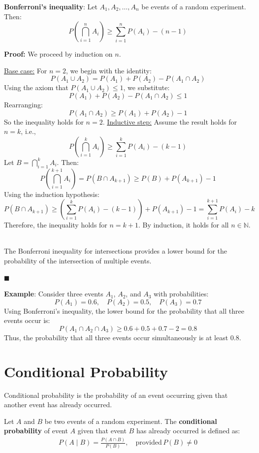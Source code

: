 \documentclass[twoside]{book}
\begin{document}
\begin{textbox}
\textbf{Bonferroni's inequality}: Let \( A_1, A_2, \ldots, A_n \) be events of a random experiment. Then:
\[
P\left( \bigcap_{i=1}^n A_i \right) \geq \sum_{i=1}^n P(A_i) - (n - 1)
\]
\end{textbox}
\textbf{Proof:} We proceed by induction on \( n \).

\underline{Base case:} For \( n = 2 \),
we begin with the identity:
\[
P(A_1 \cup A_2) = P(A_1) + P(A_2) - P(A_1 \cap A_2)
\]
Using the axiom that \( P(A_1 \cup A_2) \leq 1 \), we substitute:
\[
P(A_1) + P(A_2) - P(A_1 \cap A_2) \leq 1
\]
Rearranging:
\[
 P(A_1 \cap A_2) \geq P(A_1) + P(A_2) - 1
\]
So the inequality holds for $n = 2$.
\underline{Inductive step:} Assume the result holds for \( n = k \), i.e.,
\[
P\left( \bigcap_{i=1}^{k} A_i \right) \geq \sum_{i=1}^{k} P(A_i) - (k - 1)
\]
Let \( B = \bigcap_{i=1}^{k} A_i \). Then:
\[
P\left( \bigcap_{i=1}^{k+1} A_i \right) = P(B \cap A_{k+1}) \geq P(B) + P(A_{k+1}) - 1
\]
Using the induction hypothesis:
\[
P(B \cap A_{k+1}) \geq \left( \sum_{i=1}^{k} P(A_i) - (k - 1) \right) + P(A_{k+1}) - 1 = \sum_{i=1}^{k+1} P(A_i) - k
\]
Therefore, the inequality holds for \( n = k + 1 \). By induction, it holds for all \( n \in \mathbb{N} \). \

The Bonferroni inequality for intersections provides a lower bound for the probability of the intersection of multiple events.

\hfill\(\blacksquare\)

\textbf{Example}: Consider three events \( A_1 \), \( A_2 \), and \( A_3 \) with probabilities:
\[
P(A_1) = 0.6, \quad P(A_2) = 0.5, \quad P(A_3) = 0.7
\]
Using Bonferroni’s inequality, the lower bound for the probability that all three events occur is:
\[
P(A_1 \cap A_2 \cap A_3) \geq 0.6 + 0.5 + 0.7 - 2 = 0.8
\]
Thus, the probability that all three events occur simultaneously is at least \( 0.8 \).

\section{Conditional Probability}

Conditional probability is the probability of an event occurring given that another event has already occurred.

\begin{textbox}
    Let $A$ and $B$ be two events of a random experiment. The \textbf{conditional probability} of event \( A \) given that event \( B \) has already occurred is defined as:
\begin{align*}
P(A \mid B) = \frac{P(A \cap B)}{P(B)}, \quad \text{provided} \, P(B) \neq 0
\end{align*}
\end{textbox}
\end{document}
